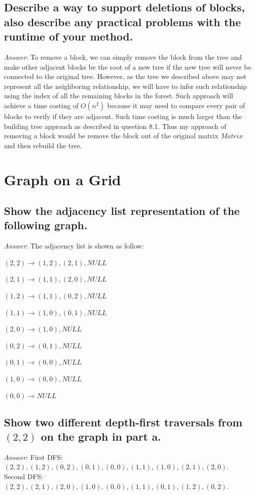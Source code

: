 \documentclass[11pt]{article}
\begin{document}
\subsection{Describe a way to support deletions of blocks, also describe any practical problems with the runtime of your method.}
\noindent \emph{Answer}: To remove a block, we can simply remove the block from the tree and make other adjacent blocks be the root of a new tree if the new tree will never be connected to the original tree. However, as the tree we described above may not represent all the neighboring relationship, we will have to infer such relationship using the index of all the remaining blocks in the forest. Such approach will achieve a time costing of $O(n^2)$ because it may need to compare every pair of blocks to verify if they are adjacent. Such time costing is much larger than the building tree approach as described in question 8.1. Thus my approach of removing a block would be remove the block out of the original matrix $Matrix$ and then rebuild the tree.
\section{Graph on a Grid}
\subsection{Show the adjacency list representation of the following graph.}
\noindent \emph{Answer}: The adjacency list is shown as follow:

$(2,2) \to (1,2), (2,1), NULL$

$(2,1) \to (1,1), (2,0), NULL$

$(1,2) \to (1,1), (0,2), NULL$

$(1,1) \to (1,0), (0,1), NULL$

$(2,0) \to (1,0), NULL$

$(0,2) \to (0,1), NULL$

$(0,1) \to (0,0), NULL$

$(1,0) \to (0,0), NULL$

$(0,0) \to NULL$

\subsection{Show two different depth-first traversals from $(2,2)$ on the graph in part a.}
\noindent \emph{Answer}: First DFS:$(2,2),(1,2),(0,2),(0,1),(0,0),(1,1),(1,0),(2,1),(2,0)$.\\Second DFS:$(2,2),(2,1),(2,0),(1,0),(0,0),(1,1),(0,1),(1,2),(0,2)$.
\end{document}
